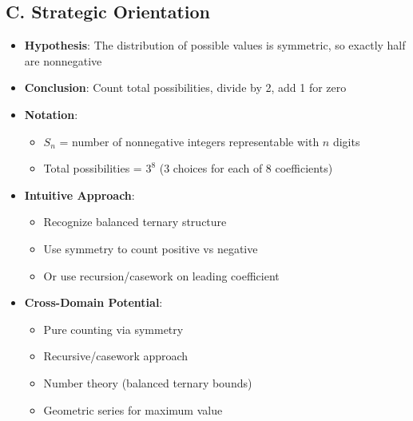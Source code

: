 \documentclass[12pt]{article}
\begin{document}
\begin{problemconfigbox}
\subsection*{C. Strategic Orientation}
\begin{itemize}[leftmargin=*]
    \item \textbf{Hypothesis}: The distribution of possible values is symmetric, so exactly half are nonnegative
    \item \textbf{Conclusion}: Count total possibilities, divide by 2, add 1 for zero
    \item \textbf{Notation}: 
    \begin{itemize}
        \item $S_n$ = number of nonnegative integers representable with $n$ digits
        \item Total possibilities = $3^8$ (3 choices for each of 8 coefficients)
    \end{itemize}
    \item \textbf{Intuitive Approach}: 
    \begin{itemize}
        \item Recognize balanced ternary structure
        \item Use symmetry to count positive vs negative
        \item Or use recursion/casework on leading coefficient
    \end{itemize}
    \item \textbf{Cross-Domain Potential}: 
    \begin{itemize}
        \item Pure counting via symmetry
        \item Recursive/casework approach
        \item Number theory (balanced ternary bounds)
        \item Geometric series for maximum value
    \end{itemize}
\end{itemize}
\end{problemconfigbox}
\end{document}
